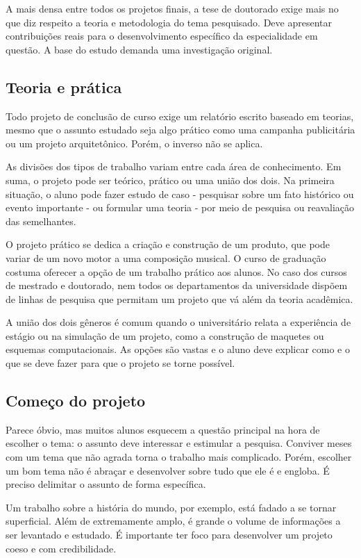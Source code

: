 A mais densa entre todos os projetos finais, a tese de doutorado exige mais no que diz respeito a teoria e metodologia do tema pesquisado. Deve apresentar contribuições reais para o desenvolvimento específico da especialidade em questão. A base do estudo demanda uma investigação original.

\subsection{Teoria e prática}
Todo projeto de conclusão de curso exige um relatório escrito baseado em teorias, mesmo que o assunto estudado seja algo prático como uma campanha publicitária ou um projeto arquitetônico. Porém, o inverso não se aplica.

As divisões dos tipos de trabalho variam entre cada área de conhecimento. Em suma, o projeto pode ser teórico, prático ou uma união dos dois. Na primeira situação, o aluno pode fazer estudo de caso - pesquisar sobre um fato histórico ou evento importante - ou formular uma teoria - por meio de pesquisa ou reavaliação das semelhantes.

O projeto prático se dedica a criação e construção de um produto, que pode variar de um novo motor a uma composição musical. O curso de graduação costuma oferecer a opção de um trabalho prático aos alunos. No caso dos cursos de mestrado e doutorado, nem todos os departamentos da universidade dispõem de linhas de pesquisa que permitam um projeto que vá além da teoria acadêmica.

A união dos dois gêneros é comum quando o universitário relata a experiência de estágio ou na simulação de um projeto, como a construção de maquetes ou esquemas computacionais. As opções são vastas e o aluno deve explicar como e o que se deve fazer para que o projeto se torne possível.

\subsection{Começo do projeto}
Parece óbvio, mas muitos alunos esquecem a questão principal na hora de escolher o tema: o assunto deve interessar e estimular a pesquisa. Conviver meses com um tema que não agrada torna o trabalho mais complicado. Porém, escolher um bom tema não é abraçar e desenvolver sobre tudo que ele é e engloba. É preciso delimitar o assunto de forma específica.

Um trabalho sobre a história do mundo, por exemplo, está fadado a se tornar superficial. Além de extremamente amplo, é grande o volume de informações a ser levantado e estudado. É importante ter foco para desenvolver um projeto coeso e com credibilidade.

